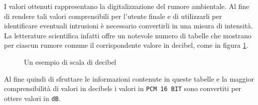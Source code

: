 I valori ottenuti rappresentano la digitalizzazione del rumore ambientale. Al fine di rendere tali valori comprensibili per l'utente finale e di utilizzarli per identificare eventuali intrusioni è necessario convertirli in una misura di intensità. La letterature scientifica infatti offre un notevole numero di tabelle che mostrano per ciascun rumore comune il corrispondente valore in decibel, come in figura \ref{img:decibels}. 

\begin{figure}[!ht]
\begin{center}
\caption{Un esempio di scala di decibel}
\label{img:decibels}
\end{center}
\end{figure}

Al fine quindi di sfruttare le informazioni contenute in queste tabelle e la maggior comprensibilità di valori in decibels i valori in \texttt{PCM 16 BIT} sono convertiti per ottere valori in \texttt{dB}.\\

